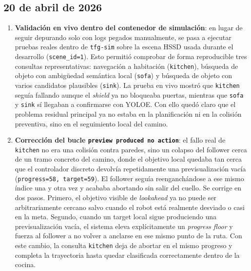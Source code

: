\documentclass[11pt,a4paper]{article}
\begin{document}
\subsection*{20 de abril de 2026}

\begin{enumerate}

  \item \textbf{Validación en vivo dentro del contenedor de simulación}: en
        lugar de seguir depurando solo con logs pegados manualmente, se pasa a
        ejecutar pruebas reales dentro de \texttt{tfg-sim} sobre la escena
        HSSD usada durante el desarrollo (\texttt{scene\_id=1}). Esto permitió
        comprobar de forma reproducible tres consultas representativas:
        navegación a habitación (\texttt{kitchen}), búsqueda de objeto con
        ambigüedad semántica local (\texttt{sofa}) y búsqueda de objeto con
        varios candidatos plausibles (\texttt{sink}). La prueba en vivo mostró
        que \texttt{kitchen} seguía fallando aunque el \textit{shield} ya no
        bloqueaba puertas, mientras que \texttt{sofa} y \texttt{sink} sí
        llegaban a confirmarse con YOLOE. Con ello quedó claro que el problema
        residual principal ya no estaba en la planificación ni en la
        colisión preventiva, sino en el seguimiento local del camino.

  \item \textbf{Corrección del bucle \texttt{preview produced no action}}:
        el fallo real de \texttt{kitchen} no era una colisión contra paredes,
        sino un colapso del follower cerca de un tramo concreto del camino,
        donde el objetivo local quedaba tan cerca que el controlador discreto
        devolvía repetidamente una previsualización vacía
        (\texttt{progress=58, target=59}). El follower seguía reenganchándose a
        ese mismo índice una y otra vez y acababa abortando sin salir del
        cuello. Se corrige en dos pasos. Primero, el objetivo visible de
        \textit{lookahead} ya no puede ser arbitrariamente cercano salvo cuando
        el robot está realmente desviado o casi en la meta. Segundo, cuando un
        target local sigue produciendo una previsualización vacía, el sistema
        eleva explícitamente un \textit{progress floor} y fuerza al follower a
        no volver a anclarse en ese mismo punto de la ruta. Con este cambio, la
        consulta \texttt{kitchen} deja de abortar en el mismo progreso y
        completa la trayectoria hasta quedar clasificada correctamente dentro de
        la cocina.


\end{enumerate}
\end{document}

